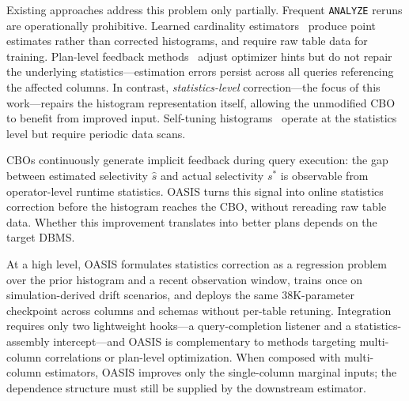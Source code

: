 \documentclass[runningheads]{llncs}
\begin{document}
Existing approaches address this problem only partially.
Frequent \texttt{ANALYZE} reruns are operationally prohibitive.
Learned cardinality estimators~\cite{yang2020neurocard,yang2020face} produce point estimates rather than corrected histograms, and require raw table data for training.
Plan-level feedback methods~\cite{stillger2001leo,marcus2022bao} adjust optimizer hints but do not repair the underlying statistics---estimation errors persist across all queries referencing the affected columns.
In contrast, \emph{statistics-level} correction---the focus of this work---repairs the histogram representation itself, allowing the unmodified CBO to benefit from improved input.
Self-tuning histograms~\cite{aboulnaga1999self} operate at the statistics level but require periodic data scans.

CBOs continuously generate implicit feedback during query execution: the gap between estimated selectivity $\hat{s}$ and actual selectivity $s^*$ is observable from operator-level runtime statistics. OASIS turns this signal into online statistics correction before the histogram reaches the CBO, without rereading raw table data. Whether this improvement translates into better plans depends on the target DBMS.

At a high level, OASIS formulates statistics correction as a regression problem over the prior histogram and a recent observation window, trains once on simulation-derived drift scenarios, and deploys the same 38K-parameter checkpoint across columns and schemas without per-table retuning. Integration requires only two lightweight hooks---a query-completion listener and a statistics-assembly intercept---and OASIS is complementary to methods targeting multi-column correlations or plan-level optimization. When composed with multi-column estimators, OASIS improves only the single-column marginal inputs; the dependence structure must still be supplied by the downstream estimator.
\end{document}
